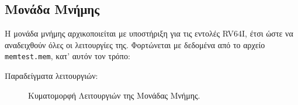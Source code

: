 \documentclass[11pt]{extarticle}
\begin{document}
\subsection{Μονάδα Μνήμης}
Η μονάδα μνήμης αρχικοποιείται με υποστήριξη για τις εντολές RV64I, έτσι ώστε να αναδειχθούν όλες οι λειτουργίες της.
Φορτώνεται με δεδομένα από το αρχείο \texttt{memtest.mem}, κατ' αυτόν τον τρόπο:
\begin{table}[H]
\end{table}
Παραδείγματα λειτουργιών:
\begin{figure}[H]
\renewcommand{\figurename}{Κυματομορφή} 
\centering
{}
\caption[Κυματομορφή - Μονάδα Μνήμης]{Κυματομορφή Λειτουργιών της Μονάδας Μνήμης.}
\end{figure}
\end{document}
